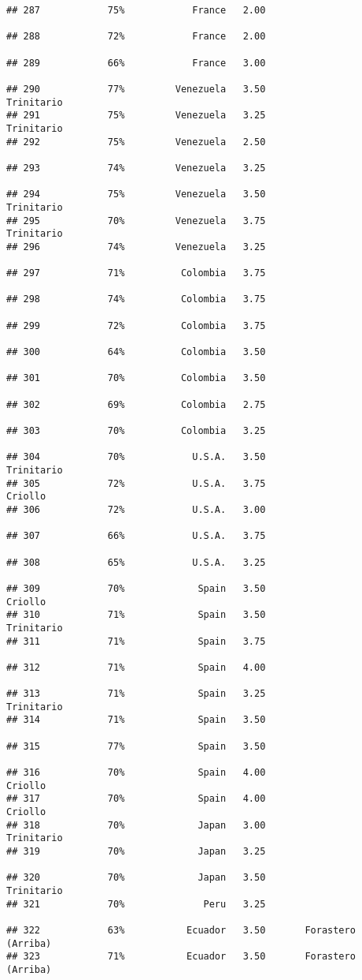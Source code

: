 \documentclass[
]{article}
\begin{document}
\begin{verbatim}
## 287            75%            France   2.00                         
## 288            72%            France   2.00                         
## 289            66%            France   3.00                         
## 290            77%         Venezuela   3.50               Trinitario
## 291            75%         Venezuela   3.25               Trinitario
## 292            75%         Venezuela   2.50                         
## 293            74%         Venezuela   3.25                         
## 294            75%         Venezuela   3.50               Trinitario
## 295            70%         Venezuela   3.75               Trinitario
## 296            74%         Venezuela   3.25                         
## 297            71%          Colombia   3.75                         
## 298            74%          Colombia   3.75                         
## 299            72%          Colombia   3.75                         
## 300            64%          Colombia   3.50                         
## 301            70%          Colombia   3.50                         
## 302            69%          Colombia   2.75                         
## 303            70%          Colombia   3.25                         
## 304            70%            U.S.A.   3.50               Trinitario
## 305            72%            U.S.A.   3.75                  Criollo
## 306            72%            U.S.A.   3.00                         
## 307            66%            U.S.A.   3.75                         
## 308            65%            U.S.A.   3.25                         
## 309            70%             Spain   3.50                  Criollo
## 310            71%             Spain   3.50               Trinitario
## 311            71%             Spain   3.75                         
## 312            71%             Spain   4.00                         
## 313            71%             Spain   3.25               Trinitario
## 314            71%             Spain   3.50                         
## 315            77%             Spain   3.50                         
## 316            70%             Spain   4.00                  Criollo
## 317            70%             Spain   4.00                  Criollo
## 318            70%             Japan   3.00               Trinitario
## 319            70%             Japan   3.25                         
## 320            70%             Japan   3.50               Trinitario
## 321            70%              Peru   3.25                         
## 322            63%           Ecuador   3.50       Forastero (Arriba)
## 323            71%           Ecuador   3.50       Forastero (Arriba)

\end{verbatim}
\end{document}
